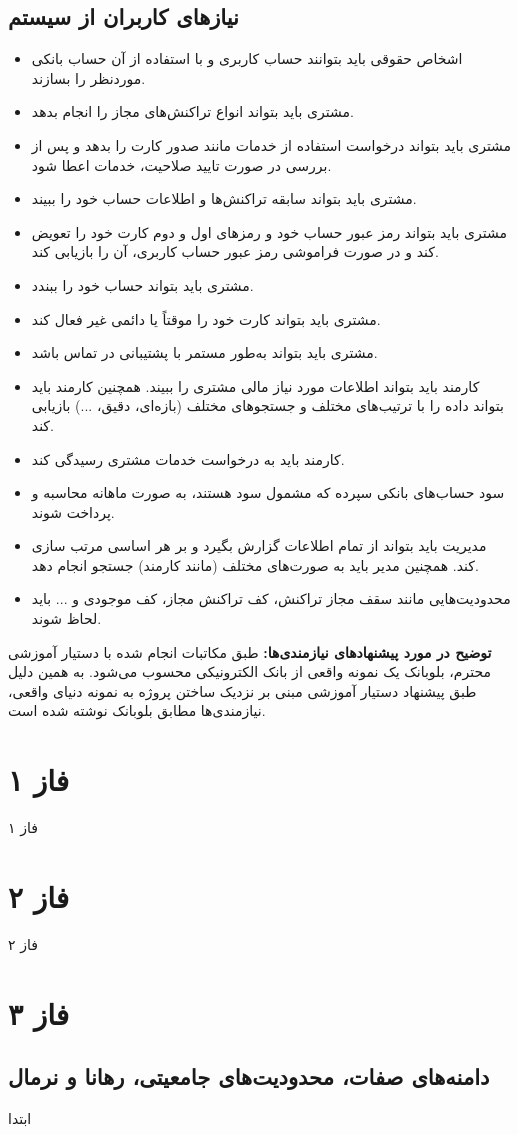 \documentclass{article}
\begin{document}
    \subsection{نیازهای کاربران از سیستم}
        \begin{itemize}
            \item اشخاص حقوقی باید بتوانند حساب کاربری و با استفاده از آن حساب بانکی موردنظر را بسازند.
            \item مشتری باید بتواند انواع تراکنش‌های مجاز را انجام بدهد.
            \item مشتری باید بتواند درخواست استفاده از خدمات مانند صدور کارت را بدهد و پس از بررسی در صورت تایید صلاحیت، خدمات اعطا شود.
            \item مشتری باید بتواند سابقه تراکنش‌ها و اطلاعات حساب‌ خود را ببیند.
            \item مشتری باید بتواند رمز عبور حساب خود و رمزهای اول و دوم کارت خود را تعویض کند و در صورت فراموشی رمز عبور حساب کاربری، آن را بازیابی کند.
            \item مشتری باید بتواند حساب‌ خود را ببندد.
            \item مشتری باید بتواند کارت‌ خود را موقتاً یا دائمی غیر فعال کند.
            \item مشتری باید بتواند به‌طور مستمر با پشتیبانی در تماس باشد.
            \item کارمند باید بتواند اطلاعات مورد نیاز مالی مشتری را ببیند. همچنین کارمند باید بتواند 
            داده را با ترتیب‌های مختلف و جستجوهای مختلف (بازه‌ای، دقیق، ...) بازیابی کند.
            \item کارمند باید به درخواست خدمات مشتری رسیدگی کند.
            \item سود حساب‌های بانکی سپرده که مشمول سود هستند، به صورت ماهانه محاسبه و پرداخت شوند.
            \item مدیریت باید بتواند از تمام اطلاعات گزارش بگیرد و بر هر اساسی مرتب سازی کند. همچنین مدیر باید 
            به صورت‌های مختلف (مانند کارمند) جستجو انجام دهد.
            \item محدودیت‌هایی مانند سقف مجاز تراکنش، کف تراکنش مجاز، کف موجودی و ... باید لحاظ شوند. 
        \end{itemize}

\textbf{توضیح در مورد پیشنهادهای نیازمندی‌ها:}
طبق مکاتبات انجام شده با دستیار آموزشی محترم، بلوبانک یک نمونه واقعی از بانک الکترونیکی 
محسوب می‌شود. به همین دلیل طبق پیشنهاد دستیار آموزشی مبنی بر نزدیک ساختن پروژه به نمونه دنیای واقعی،
نیازمندی‌ها مطابق بلوبانک نوشته شده است. 
    
\section{فاز ۱}
فاز ۱


\section{فاز ۲}
فاز ۲

\section{فاز ۳}
	\subsection{دامنه‌های صفات، محدودیت‌های جامعیتی، رهانا و نرمال‌}
ابتدا
\end{document}
